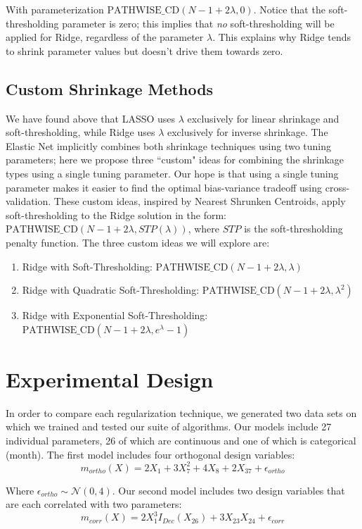 \documentclass[11pt]{article}
\newcommand{\pcd}{\text{PATHWISE\_CD}}
\begin{document}
With parameterization $\pcd(N-1+2\lambda,0)$.  Notice that the soft-thresholding parameter is zero; this implies that \textit{no} soft-thresholding will be applied for Ridge, regardless of the parameter $\lambda$.  This explains why Ridge tends to shrink parameter values but doesn't drive them towards zero.  

\subsection{Custom Shrinkage Methods}
We have found above that LASSO uses $\lambda$ exclusively for linear shrinkage and soft-thresholding, while Ridge uses $\lambda$ exclusively for inverse shrinkage.  The Elastic Net implicitly combines both shrinkage techniques using two tuning parameters; here we propose three ``custom" ideas for combining the shrinkage types using a single tuning parameter.  Our hope is that using a single tuning parameter makes it easier to find the optimal bias-variance tradeoff using cross-validation.  These custom ideas, inspired by Nearest Shrunken Centroids, apply soft-thresholding to the Ridge solution in the form: $\pcd(N-1 + 2\lambda, STP(\lambda))$, where $STP$ is the soft-thresholding penalty function.  The three custom ideas we will explore are:
\begin{enumerate}
	\item Ridge with Soft-Thresholding: $\pcd(N-1 + 2\lambda, \lambda)$
	\item Ridge with Quadratic Soft-Thresholding: $\pcd(N-1 + 2\lambda, \lambda^2)$
	\item Ridge with Exponential Soft-Thresholding: $\pcd(N-1 + 2\lambda, e^\lambda-1)$
\end{enumerate}

\section{Experimental Design}
In order to compare each regularization technique, we generated two data sets on which we trained and tested our suite of algorithms.  Our models include 27 individual parameters, 26 of which are continuous and one of which is categorical (month).  The first model includes four orthogonal design variables:
	$$m_{ortho}(X) = 2X_1 + 3X_7^2 + 4X_8 + 2X_{37} + \epsilon_{ortho}$$

Where $\epsilon_{ortho} \sim \mathcal{N}(0,4)$.  Our second model includes two design variables that are each correlated with two parameters:
	$$m_{corr}(X) = 2X_1^3I_{Dec}(X_{26}) + 3X_{23}X_{24} + \epsilon_{corr}$$
\end{document}
